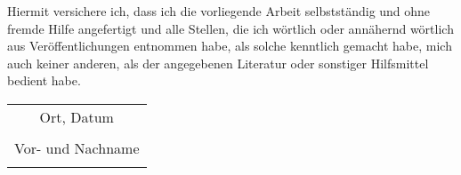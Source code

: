 


Hiermit versichere ich, dass ich die vorliegende Arbeit selbstständig und ohne fremde Hilfe angefertigt und alle Stellen, die ich wörtlich oder annähernd wörtlich aus Veröffentlichungen entnommen habe, als solche kenntlich gemacht habe, mich auch keiner anderen, als der angegebenen Literatur oder sonstiger Hilfsmittel bedient habe.

\bigskip
\bigskip 
\bigskip 
\bigskip 
\bigskip 

\begin{flushright}
\begin{tabular}{c}
Ort, Datum
\vspace*{1.5cm} \\ 

\dotfill \\
Vor- und Nachname \\
\hspace{5cm} \\
\end{tabular}
\end{flushright}